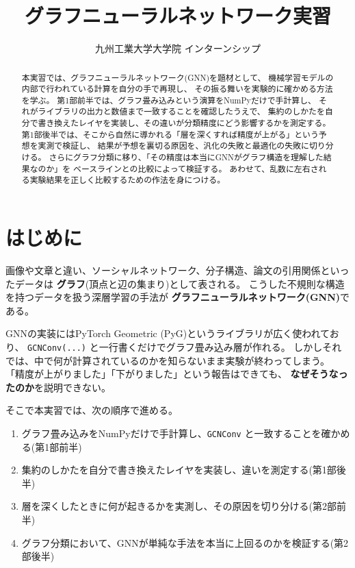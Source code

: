 \documentclass[11pt,a4paper]{jsarticle}
\title{グラフニューラルネットワーク実習}
\author{九州工業大学大学院 インターンシップ}
\date{}
\begin{document}
\maketitle

\begin{abstract}
本実習では、グラフニューラルネットワーク(GNN)を題材として、
機械学習モデルの内部で行われている計算を自分の手で再現し、
その振る舞いを実験的に確かめる方法を学ぶ。
第1部前半では、グラフ畳み込みという演算をNumPyだけで手計算し、
それがライブラリの出力と数値まで一致することを確認したうえで、
集約のしかたを自分で書き換えたレイヤを実装し、その違いが分類精度にどう影響するかを測定する。
第1部後半では、そこから自然に導かれる「層を深くすれば精度が上がる」という予想を実測で検証し、
結果が予想を裏切る原因を、汎化の失敗と最適化の失敗に切り分ける。
さらにグラフ分類に移り、「その精度は本当にGNNがグラフ構造を理解した結果なのか」を
ベースラインとの比較によって検証する。
あわせて、乱数に左右される実験結果を正しく比較するための作法を身につける。
\end{abstract}
\thispagestyle{fancy}

\section{はじめに}

画像や文章と違い、ソーシャルネットワーク、分子構造、論文の引用関係といったデータは
\textbf{グラフ}(頂点と辺の集まり)として表される。
こうした不規則な構造を持つデータを扱う深層学習の手法が
\textbf{グラフニューラルネットワーク(GNN)}である。

GNNの実装にはPyTorch Geometric (PyG)というライブラリが広く使われており、
\verb|GCNConv(...)| と一行書くだけでグラフ畳み込み層が作れる。
しかしそれでは、中で何が計算されているのかを知らないまま実験が終わってしまう。
「精度が上がりました」「下がりました」という報告はできても、
\textbf{なぜそうなったのか}を説明できない。

そこで本実習では、次の順序で進める。

\begin{enumerate}
\item グラフ畳み込みをNumPyだけで手計算し、\verb|GCNConv| と一致することを確かめる(第1部前半)
\item 集約のしかたを自分で書き換えたレイヤを実装し、違いを測定する(第1部後半)
\item 層を深くしたときに何が起きるかを実測し、その原因を切り分ける(第2部前半)
\item グラフ分類において、GNNが単純な手法を本当に上回るのかを検証する(第2部後半)
\end{enumerate}
\end{document}
